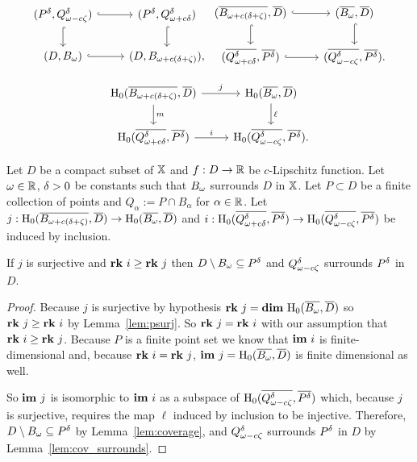 \[ \begin{tikzcd}
  (P^\of, \Q^\of) \arrow[hookrightarrow]{r}\arrow[hookrightarrow]{d} &
  (P^\of, \QQ^\of) \arrow[hookrightarrow]{d} \\
  (D, \bb) \arrow[hookrightarrow]{r} &
  (D, \BB),
\end{tikzcd}\begin{tikzcd}
  (\cmp{\BB},\cmp{D})\arrow[hookrightarrow]{d}\arrow[hookrightarrow]{r} &
  (\cmp{\bb}, \cmp{D}) \arrow[hookrightarrow]{d}\\
  (\cmp{\QQ^\of}, \cmp{P^\of}) \arrow[hookrightarrow]{r} &
  (\cmp{\Q^\of}, \cmp{P^\of}).
\end{tikzcd}\]

\begin{equation}\label{dgm:1}\begin{tikzcd}
  \hom_0(\cmp{\BB},\cmp{D})\arrow{d}{m} \arrow{r}{j} &
  \hom_0(\cmp{\bb}, \cmp{D}) \arrow{d}{\ell} \\
  \hom_0(\cmp{\QQ^\of}, \cmp{P^\of}) \arrow{r}{i} &
  \hom_0(\cmp{\Q^\of}, \cmp{P^\of}).
\end{tikzcd}\end{equation}

\begin{theorem}\label{thm:geo_tcc}
  Let $D$ be a compact subset of $\mathbb{X}$ and $f : D\to\mathbb{R}$ be $c$-Lipschitz function.
  Let $\omega\in\mathbb{R}$, ${\delta} > 0$ be constants such that $B_{\omega}$ surrounds $D$ in $\mathbb{X}$.
  Let $P\subset D$ be a finite collection of points and $Q_\alpha := P\cap B_\alpha$ for $\alpha\in\mathbb{R}$.
  Let $j : \mathrm{H}_0(\overline{B_{\omega + c(\delta+\zeta)}},\overline{D})\to \mathrm{H}_0(\overline{B_{\omega}},\overline{D})$ and $i : \mathrm{H}_0(\overline{Q_{\omega + c{\delta}}^{\delta}}, \overline{P^{\delta}})\to \mathrm{H}_0(\overline{Q_{\omega - c\zeta}^{\delta}}, \overline{P^{\delta}})$ be induced by inclusion.

  If $j$ is surjective and $\mathbf{rk}~i\geq \mathbf{rk}~j$ then $D\setminus B_{\omega}\subseteq P^{\delta}$ and $Q_{\omega - c\zeta}^{\delta}$ surrounds $P^{\delta}$ in $D$.
\end{theorem}
\begin{proof}
  Because $j$ is surjective by hypothesis $\mathbf{rk}~j = \mathbf{dim}~\mathrm{H}_0(\overline{B_{\omega}},\overline{D})$ so $\mathbf{rk}~j\geq \mathbf{rk}~i$ by Lemma~\ref{lem:psurj}.
  So $\mathbf{rk}~j = \mathbf{rk}~i$ with our assumption that $\mathbf{rk}~i\geq \mathbf{rk}~j$.
  Because $P$ is a finite point set we know that $\mathbf{im}~i$ is finite-dimensional and, because $\mathbf{rk}~i = \mathbf{rk}~j$, $\mathbf{im}~j=\mathrm{H}_0(\overline{B_{\omega}}, \overline{D})$ is finite dimensional as well.

  So $\mathbf{im}~j$ is isomorphic to $\mathbf{im}~i$ as a subspace of $\mathrm{H}_0(\overline{Q_{\omega - c\zeta}^{\delta}}, \overline{P^{\delta}})$ which, because $j$ is surjective, requires the map $\ell$ induced by inclusion to be injective.
  Therefore, $D\setminus B_\omega\subseteq P^{\delta}$ by Lemma~\ref{lem:coverage}, and $Q_{\omega - c\zeta}^{\delta}$ surrounds $P^{\delta}$ in $D$ by Lemma~\ref{lem:cov_surrounds}.
\end{proof}
